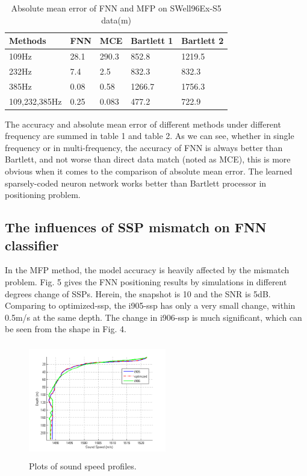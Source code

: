 \begin{table}[]
\caption{Absolute mean error of FNN and MFP on SWell96Ex-S5 data(m)}
\label{my-label}
\begin{tabular}{@{}lllll@{}}
\toprule
Methods       & FNN  & MCE   & Bartlett 1 & Bartlett 2 \\ \midrule
109Hz         & 28.1 & 290.3 & 852.8      & 1219.5     \\
232Hz         & 7.4  & 2.5   & 832.3      & 832.3      \\
385Hz         & 0.08 & 0.58  & 1266.7     & 1756.3     \\
109,232,385Hz & 0.25 & 0.083 & 477.2      & 722.9      \\ \bottomrule
\end{tabular}
\end{table}

The accuracy and absolute mean error of different methods under different frequency are summed in table 1 and table 2. As we can see, whether in single frequency or in multi-frequency, the accuracy of FNN is always better than Bartlett, and not worse than direct data match (noted as MCE), this is more obvious when it comes to the comparison of absolute mean error.
The learned sparsely-coded neuron network works better than Bartlett processor in positioning problem.

\subsection{The influences of SSP mismatch on FNN classifier}
In the MFP method, the model accuracy is heavily affected by the mismatch problem\cite{tolstoy1989sensitivity,feuillade1989environmental,del1988effects}. Fig. 5 gives the FNN positioning results by simulations in different degrees change of SSPs. Herein, the snapshot is 10 and the SNR is 5dB.
Comparing to optimized-ssp, the i905-ssp has only a very small change, within 0.5m/s at the same depth. The change in i906-ssp is much significant, which can be seen from the shape in Fig. 4.
\begin{figure}
\includegraphics[width=6cm,height=5cm]{figure/ssp3}
\caption{Plots of sound speed profiles.}
\end{figure}


